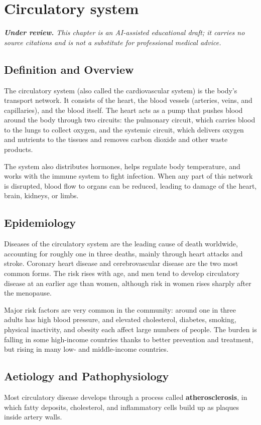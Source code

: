 \chapter{Circulatory system}

\medskip
\noindent\textit{\textbf{Under review.} This chapter is an AI-assisted educational draft; it carries no source citations and is not a substitute for professional medical advice.}

\section*{Definition and Overview}
The circulatory system (also called the cardiovascular system) is the body's transport network. It consists of the heart, the blood vessels (arteries, veins, and capillaries), and the blood itself. The heart acts as a pump that pushes blood around the body through two circuits: the pulmonary circuit, which carries blood to the lungs to collect oxygen, and the systemic circuit, which delivers oxygen and nutrients to the tissues and removes carbon dioxide and other waste products.

The system also distributes hormones, helps regulate body temperature, and works with the immune system to fight infection. When any part of this network is disrupted, blood flow to organs can be reduced, leading to damage of the heart, brain, kidneys, or limbs.

\section*{Epidemiology}
Diseases of the circulatory system are the leading cause of death worldwide, accounting for roughly one in three deaths, mainly through heart attacks and stroke. Coronary heart disease and cerebrovascular disease are the two most common forms. The risk rises with age, and men tend to develop circulatory disease at an earlier age than women, although risk in women rises sharply after the menopause.

Major risk factors are very common in the community: around one in three adults has high blood pressure, and elevated cholesterol, diabetes, smoking, physical inactivity, and obesity each affect large numbers of people. The burden is falling in some high-income countries thanks to better prevention and treatment, but rising in many low- and middle-income countries.

\section*{Aetiology and Pathophysiology}
Most circulatory disease develops through a process called \textbf{atherosclerosis}, in which fatty deposits, cholesterol, and inflammatory cells build up as plaques inside artery walls.

